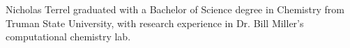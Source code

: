 Nicholas Terrel graduated with a Bachelor of Science degree in Chemistry from Truman State University, with research experience in Dr. Bill Miller's computational chemistry lab. 